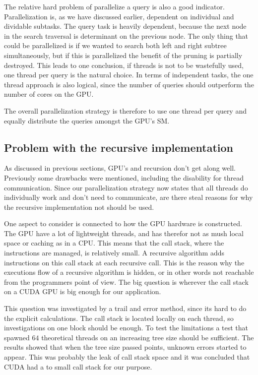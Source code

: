The relative hard problem of parallelize a query is also a good indicator. Parallelization is, as we have discussed earlier, dependent on individual and dividable subtasks. The query task is heavily dependent, because the next node in the search traversal is determinant on the previous node. The only thing that could be parallelized is if we wanted to search both left and right subtree simultaneously, but if this is parallelized the benefit of the pruning is partially destroyed. This leads to one conclusion, if threads is not to be wastefully used, one thread per query is the natural choice. In terms of independent tasks, the one thread approach is also logical, since the number of queries should outperform the number of cores on the GPU\@.

The overall parallelization strategy is therefore to use one thread per query and equally distribute the queries amongst the GPU's SM\@.


\subsection{Problem with the recursive implementation} %
\label{sub:problem_with_the_recursive_implementation}

As discussed in previous sections, GPU's and recursion don't get along well. Previously some drawbacks were mentioned, including the disability for thread communication. Since our parallelization strategy now states that all threads do individually work and don't need to communicate, are there steal reasons for why the recursive implementation not should be used.

One aspect to consider is connected to how the GPU hardware is constructed. The GPU have a lot of lightweight threads, and has therefor not as mush local space or caching as in a CPU\@. This means that the call stack, where the instructions are managed, is relatively small. A recursive algorithm adds instructions on this call stack at each recursive call. This is the reason why the executions flow of a recursive algorithm is hidden, or in other words not reachable from the programmers point of view. The big question is wherever the call stack on a CUDA GPU is big enough for our application.

This question was investigated by a trail and error method, since its hard to do the explicit calculations. The call stack is located locally on each thread, so investigations on one block should be enough. To test the limitations a test that spawned $64$ theoretical threads on an increasing tree size should be sufficient. The results showed that when the tree size passed  points, unknown errors started to appear. This was probably the leak of call stack space and it was concluded that CUDA had a to small call stack for our purpose.

